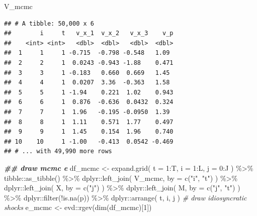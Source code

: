 \documentclass[
]{book}
\newenvironment{Shaded}{\begin{snugshade}}{\end{snugshade}}
\newcommand{\AttributeTok}[1]{\textcolor[rgb]{0.77,0.63,0.00}{#1}}
\newcommand{\CommentTok}[1]{\textcolor[rgb]{0.56,0.35,0.01}{\textit{#1}}}
\newcommand{\DecValTok}[1]{\textcolor[rgb]{0.00,0.00,0.81}{#1}}
\newcommand{\DocumentationTok}[1]{\textcolor[rgb]{0.56,0.35,0.01}{\textbf{\textit{#1}}}}
\newcommand{\FunctionTok}[1]{\textcolor[rgb]{0.00,0.00,0.00}{#1}}
\newcommand{\NormalTok}[1]{#1}
\newcommand{\OtherTok}[1]{\textcolor[rgb]{0.56,0.35,0.01}{#1}}
\newcommand{\SpecialCharTok}[1]{\textcolor[rgb]{0.00,0.00,0.00}{#1}}
\newcommand{\StringTok}[1]{\textcolor[rgb]{0.31,0.60,0.02}{#1}}
\begin{document}
\begin{Shaded}
\begin{Highlighting}[]
\NormalTok{V\_mcmc}
\end{Highlighting}
\end{Shaded}

\begin{verbatim}
## # A tibble: 50,000 x 6
##        i     t   v_x_1  v_x_2   v_x_3    v_p
##    <int> <int>   <dbl>  <dbl>   <dbl>  <dbl>
##  1     1     1 -0.715  -0.798 -0.548   1.09 
##  2     2     1  0.0243 -0.943 -1.88    0.471
##  3     3     1 -0.183   0.660  0.669   1.45 
##  4     4     1  0.0207  3.36  -0.363   1.58 
##  5     5     1 -1.94    0.221  1.02    0.943
##  6     6     1  0.876  -0.636  0.0432  0.324
##  7     7     1  1.96   -0.195 -0.0950  1.39 
##  8     8     1  1.11    0.571  1.77    0.497
##  9     9     1  1.45    0.154  1.96    0.740
## 10    10     1 -1.00   -0.413  0.0542 -0.469
## # ... with 49,990 more rows
\end{verbatim}

\begin{Shaded}
\begin{Highlighting}[]
\DocumentationTok{\#\# draw mcmc e}
\NormalTok{df\_mcmc }\OtherTok{\textless{}{-}} 
  \FunctionTok{expand.grid}\NormalTok{(}
    \AttributeTok{t =} \DecValTok{1}\SpecialCharTok{:}\NormalTok{T, }
    \AttributeTok{i =} \DecValTok{1}\SpecialCharTok{:}\NormalTok{L, }
    \AttributeTok{j =} \DecValTok{0}\SpecialCharTok{:}\NormalTok{J}
\NormalTok{    ) }\SpecialCharTok{\%\textgreater{}\%}
\NormalTok{  tibble}\SpecialCharTok{::}\FunctionTok{as\_tibble}\NormalTok{() }\SpecialCharTok{\%\textgreater{}\%}
\NormalTok{  dplyr}\SpecialCharTok{::}\FunctionTok{left\_join}\NormalTok{(}
\NormalTok{    V\_mcmc, }
    \AttributeTok{by =} \FunctionTok{c}\NormalTok{(}\StringTok{"i"}\NormalTok{, }\StringTok{"t"}\NormalTok{)}
\NormalTok{    ) }\SpecialCharTok{\%\textgreater{}\%}
\NormalTok{  dplyr}\SpecialCharTok{::}\FunctionTok{left\_join}\NormalTok{(}
\NormalTok{    X, }
    \AttributeTok{by =} \FunctionTok{c}\NormalTok{(}\StringTok{"j"}\NormalTok{)}
\NormalTok{    ) }\SpecialCharTok{\%\textgreater{}\%}
\NormalTok{  dplyr}\SpecialCharTok{::}\FunctionTok{left\_join}\NormalTok{(}
\NormalTok{    M, }
    \AttributeTok{by =} \FunctionTok{c}\NormalTok{(}\StringTok{"j"}\NormalTok{, }\StringTok{"t"}\NormalTok{)}
\NormalTok{    ) }\SpecialCharTok{\%\textgreater{}\%}
\NormalTok{  dplyr}\SpecialCharTok{::}\FunctionTok{filter}\NormalTok{(}\SpecialCharTok{!}\FunctionTok{is.na}\NormalTok{(p)) }\SpecialCharTok{\%\textgreater{}\%}
\NormalTok{  dplyr}\SpecialCharTok{::}\FunctionTok{arrange}\NormalTok{(}
\NormalTok{    t, }
\NormalTok{    i, }
\NormalTok{    j}
\NormalTok{    )}
\CommentTok{\# draw idiosyncratic shocks}
\NormalTok{e\_mcmc }\OtherTok{\textless{}{-}}\NormalTok{ evd}\SpecialCharTok{::}\FunctionTok{rgev}\NormalTok{(}\FunctionTok{dim}\NormalTok{(df\_mcmc)[}\DecValTok{1}\NormalTok{])}
\end{Highlighting}
\end{Shaded}
\end{document}
